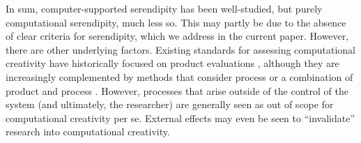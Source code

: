 In sum, computer-supported serendipity has been well-studied, but
purely computational serendipity, much less so.  This may partly be
due to the absence of clear criteria for serendipity, which we address
in the current paper.  However, there are other underlying factors.
Existing standards for assessing computational creativity have
historically focused on product evaluations \cite{ritchie07}, although
they are increasingly complemented by methods that consider process
\cite{colton2008creativity,colton-assessingprogress} or a combination
of product and process \cite{jordanous:12}.  However, processes that
arise outside of the control of the system (and ultimately, the
researcher) are generally seen as out of scope for computational
creativity per se.  External effects may even be seen to
``invalidate'' research into computational creativity.
%

